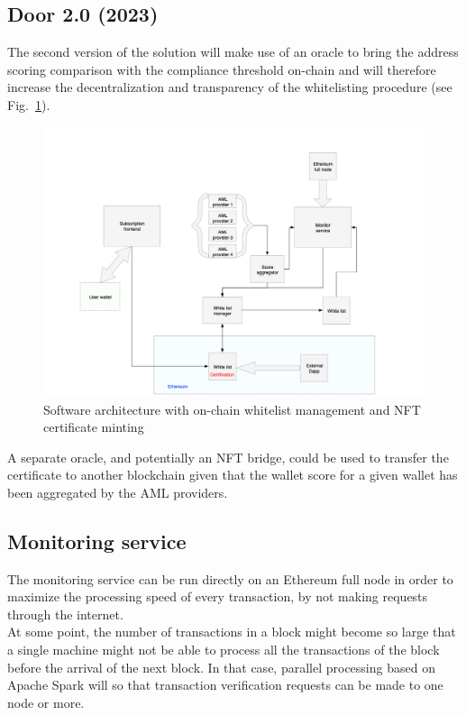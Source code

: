 ﻿\documentclass[a4paper]{article}
\begin{document}
\subsection{Door 2.0 (2023)}

The second version of the solution will make use of an oracle to bring the address scoring comparison with the compliance threshold on-chain and will therefore increase the decentralization and transparency of the whitelisting procedure (see Fig.~\ref{onchain}).
  
\begin{figure}[!h]
\centering
\includegraphics[scale=0.35]{architecture_v1.png}
\caption{Software architecture with on-chain whitelist management and NFT certificate minting}
\label{onchain}
\end{figure}

A separate oracle, and potentially an NFT bridge, could be used to transfer the certificate to another blockchain given that the wallet score for a given wallet has been aggregated by the AML providers.


\subsection{Monitoring service}
The monitoring service can be run directly on an Ethereum full node in order to maximize the processing speed of every transaction, by not making requests through the internet. \\

At some point, the number of transactions in a block might become so large that a single machine might not be able to process all the transactions of the block before the arrival of the next block. In that case, parallel processing based on Apache Spark will so that transaction verification requests can be made to one node or more. \\
\end{document}
